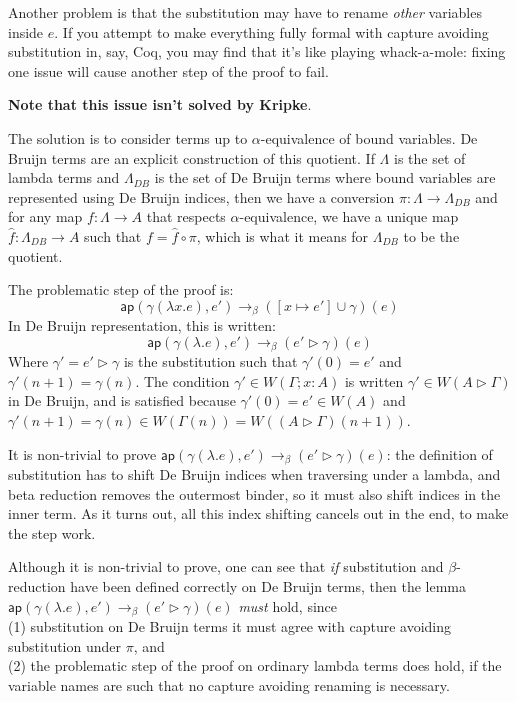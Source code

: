 \documentclass[a4paper, 11pt]{article}
\theoremstyle{definition}
\newcommand{\ap}{\mathsf{ap}}
\newcommand{\G}{\Gamma}
\begin{document}
Another problem is that the substitution may have to rename \emph{other} variables inside $e$. If you attempt to make everything fully formal with capture avoiding substitution in, say, Coq, you may find that it's like playing whack-a-mole: fixing one issue will cause another step of the proof to fail.

\textbf{Note that this issue isn't solved by Kripke}.

The solution is to consider terms up to $\alpha$-equivalence of bound variables. De Bruijn terms are an explicit construction of this quotient. If $\Lambda$ is the set of lambda terms and $\Lambda_{DB}$ is the set of De Bruijn terms where bound variables are represented using De Bruijn indices, then we have a conversion $\pi : \Lambda \to \Lambda_{DB}$ and for any map $f : \Lambda \to A$ that respects $\alpha$-equivalence, we have a unique map $\hat f : \Lambda_{DB} \to A$ such that $f = \hat f \circ \pi$, which is what it means for $\Lambda_{DB}$ to be the quotient.

\bigskip\noindent
The problematic step of the proof is:
\[
  \ap(\gamma(\lambda x. e),e') \to_\beta ([x\mapsto e'] \cup \gamma)(e)
\]
In De Bruijn representation, this is written:
\[
  \ap(\gamma(\lambda. e),e') \to_\beta (e' \triangleright \gamma)(e)
\]
Where $\gamma' = e' \triangleright \gamma$ is the substitution such that $\gamma'(0) = e'$ and $\gamma'(n+1) = \gamma(n)$. The condition $\gamma' \in W(\G; x:A)$ is written $\gamma' \in W(A \triangleright \G)$ in De Bruijn, and is satisfied because $\gamma'(0) = e' \in W(A)$ and $\gamma'(n+1) = \gamma(n) \in W(\G(n)) = W((A \triangleright \G)(n+1))$.

It is non-trivial to prove $\ap(\gamma(\lambda. e),e') \to_\beta (e' \triangleright \gamma)(e)$: the definition of substitution has to shift De Bruijn indices when traversing under a lambda, and beta reduction removes the outermost binder, so it must also shift indices in the inner term. As it turns out, all this index shifting cancels out in the end, to make the step work.

Although it is non-trivial to prove, one can see that \emph{if} substitution and $\beta$-reduction have been defined correctly on De Bruijn terms, then the lemma $\ap(\gamma(\lambda. e),e') \to_\beta (e' \triangleright \gamma)(e)$ \emph{must} hold, since \\(1) substitution on De Bruijn terms it must agree with capture avoiding substitution under $\pi$, and \\(2) the problematic step of the proof on ordinary lambda terms does hold, if the variable names are such that no capture avoiding renaming is necessary.
\end{document}
